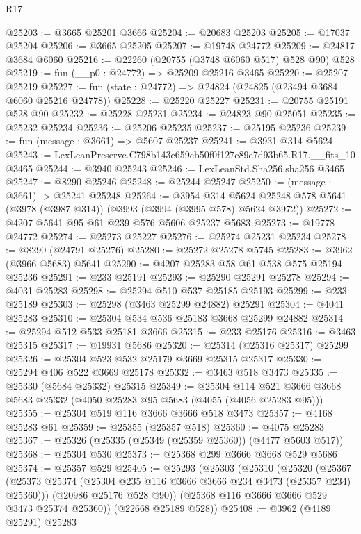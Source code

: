 \begin{lexlean}{R17}
\begin{coremodule}
@25203 := @3665 @25201 @3666
@25204 := @20683 @25203
@25205 := @17037 @25204
@25206 := @3665 @25205
@25207 := @19748 @24772
@25209 := @24817 @3684 @6060
@25216 := @22260 (@20755 (@3748 @6060 @517) @528 @90) @528
@25219 := fun (__p0 : @24772) => @25209 @25216 @3465
@25220 := @25207 @25219
@25227 := fun (state : @24772) => @24824 (@24825 (@23494 @3684 @6060 @25216 @24778))
@25228 := @25220 @25227
@25231 := @20755 @25191 @528 @90
@25232 := @25228 @25231
@25234 := @24823 @90 @25051
@25235 := @25232 @25234
@25236 := @25206 @25235
@25237 := @25195 @25236
@25239 := fun (message : @3661) => @5607 @25237
@25241 := @3931 @314 @5624
@25243 := LexLeanPreserve.C798b143e659cb50f0f127c89e7d93b65.R17.__fits_10 @3465
@25244 := @3940 @25243
@25246 := LexLeanStd.Sha256.sha256 @3465
@25247 := @8290 @25246
@25248 := @25244 @25247
@25250 := (message : @3661) -> @25241 @25248
@25264 := @3954
    @314
    @5624
    @25248
    @578
    @5641
    (@3978 (@3987 @314))
    (@3993 (@3994 (@3995 @578) @5624 @3972))
@25272 := @4207 @5641 @95 @61 @239 @576 @5606 @25237 @5683
@25273 := @19778 @24772
@25274 := @25273 @25227
@25276 := @25274 @25231 @25234
@25278 := @8290 (@24791 @25276)
@25280 := @25272 @25278 @5745
@25283 := @3962 (@3966 @5683) @5641
@25290 := @4207 @25283 @58 @61 @538 @575 @25194 @25236
@25291 := @233 @25191
@25293 := @25290 @25291 @25278
@25294 := @4031 @25283
@25298 := @25294 @510 @537 @25185 @25193
@25299 := @233 @25189
@25303 := @25298 (@3463 @25299 @24882) @25291
@25304 := @4041 @25283
@25310 := @25304 @534 @536 @25183 @3668 @25299 @24882
@25314 := @25294 @512 @533 @25181 @3666
@25315 := @233 @25176
@25316 := @3463 @25315
@25317 := @19931 @5686
@25320 := @25314 (@25316 @25317) @25299
@25326 := @25304 @523 @532 @25179 @3669 @25315 @25317
@25330 := @25294 @406 @522 @3669 @25178
@25332 := @3463 @518 @3473
@25335 := @25330 (@5684 @25332) @25315
@25349 := @25304
    @114
    @521
    @3666
    @3668
    @5683
    @25332
    (@4050 @25283 @95 @5683 (@4055 (@4056 @25283 @95)))
@25355 := @25304 @519 @116 @3666 @3666 @518 @3473
@25357 := @4168 @25283 @61
@25359 := @25355 (@25357 @518)
@25360 := @4075 @25283
@25367 := @25326 (@25335 (@25349 (@25359 @25360)) (@4477 @5603 @517))
@25368 := @25304 @530
@25373 := @25368 @299 @3666 @3668 @529 @5686
@25374 := @25357 @529
@25405 := @25293
    (@25303
      (@25310
        (@25320
          (@25367 (@25373 @25374 (@25304 @235 @116 @3666 @3666 @234 @3473 (@25357 @234) @25360)))
          (@20986 @25176 @528 @90))
        (@25368 @116 @3666 @3666 @529 @3473 @25374 @25360))
      (@22668 @25189 @528))
@25408 := @3962 (@4189 @25291) @25283

\end{coremodule}
\end{lexlean}
